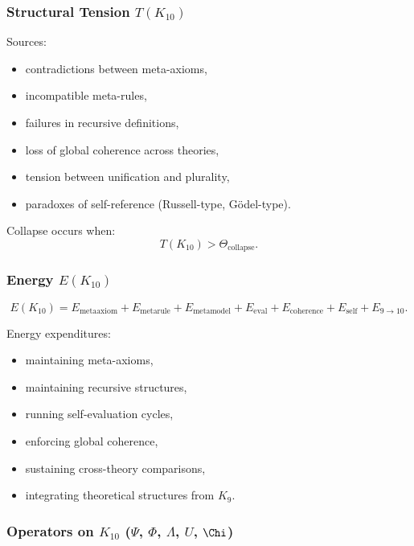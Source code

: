 \subsubsection{Structural Tension $T(K_{10})$}

Sources:
\begin{itemize}
    \item contradictions between meta-axioms,
    \item incompatible meta-rules,
    \item failures in recursive definitions,
    \item loss of global coherence across theories,
    \item tension between unification and plurality,
    \item paradoxes of self-reference (Russell-type, Gödel-type).
\end{itemize}

Collapse occurs when:
\[
T(K_{10}) > \Theta_{\mathrm{collapse}}.
\]

\subsubsection{Energy $E(K_{10})$}

\[
E(K_{10})=
E_{\mathrm{metaaxiom}}+
E_{\mathrm{metarule}}+
E_{\mathrm{metamodel}}+
E_{\mathrm{eval}}+
E_{\mathrm{coherence}}+
E_{\mathrm{self}}+
E_{9\to10}.
\]

Energy expenditures:
\begin{itemize}
    \item maintaining meta-axioms,
    \item maintaining recursive structures,
    \item running self-evaluation cycles,
    \item enforcing global coherence,
    \item sustaining cross-theory comparisons,
    \item integrating theoretical structures from $K_9$.
\end{itemize}

\subsubsection{Operators on $K_{10}$ ($\Psi$, $\Phi$, $\Lambda$, $U$, $\Chi$)}

